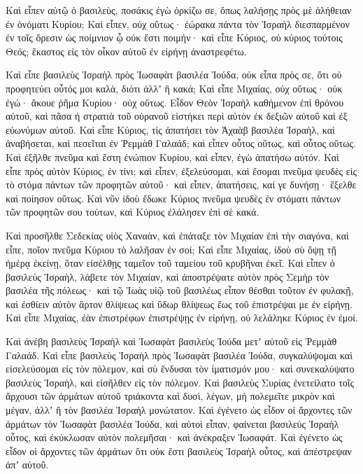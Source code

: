 {Καὶ εἶπεν αὐτῷ ὁ βασιλεὺς, ποσάκις ἐγὼ ὁρκίζω σε, ὅπως λαλήσῃς πρὸς μὲ ἀλήθειαν ἐν ὀνόματι Κυρίου;
Καὶ εἶπεν, οὐχ οὕτως· ἑώρακα πάντα τὸν Ἰσραὴλ διεσπαρμένον ἐν τοῖς ὄρεσιν ὡς ποίμνιον ᾧ οὐκ ἔστι ποιμήν· καὶ εἶπε Κύριος, οὐ κύριος τούτοις Θεός; ἕκαστος εἰς τὸν οἶκον αὐτοῦ ἐν εἰρήνῃ ἀναστρεφέτω.
\par }{\PP {}Καὶ εἶπε βασιλεὺς Ἰσραὴλ πρὸς Ἰωσαφὰτ βασιλέα Ἰούδα, οὐκ εἶπα πρὸς σε, ὅτι οὐ προφητεύει οὗτός μοι καλὰ, διότι ἀλλʼ ἢ κακά;
Καὶ εἶπε Μιχαίας, οὐχ οὕτως· οὐκ ἐγώ· ἄκουε ῥῆμα Κυρίου· οὐχ οὕτως. Εἶδον Θεὸν Ἰσραὴλ καθήμενον ἐπὶ θρόνου αὐτοῦ, καὶ πᾶσα ἡ στρατιὰ τοῦ οὐρανοῦ εἱστήκει περὶ αὐτὸν ἐκ δεξιῶν αὐτοῦ καὶ ἐξ εὐωνύμων αὐτοῦ.
Καὶ εἶπε Κύριος, τίς ἀπατήσει τὸν Ἀχαὰβ βασιλέα Ἰσραὴλ, καὶ ἀναβήσεται, καὶ πεσεῖται ἐν Ῥεμμὰθ Γαλαάδ; καὶ εἶπεν οὗτος οὕτως, καὶ οὗτος οὕτως.
Καὶ ἐξῆλθε πνεῦμα καὶ ἔστη ἐνώπιον Κυρίου, καὶ εἶπεν, ἐγὼ ἀπατήσω αὐτόν.
Καὶ εἶπε πρὸς αὐτὸν Κύριος, ἐν τίνι; καὶ εἶπεν, ἐξελεύσομαι, καὶ ἔσομαι πνεῦμα ψευδὲς εἰς τὸ στόμα πάντων τῶν προφητῶν αὐτοῦ· καὶ εἶπεν, ἀπατήσεις, καί γε δυνήσῃ· ἔξελθε καὶ ποίησον οὕτως.
Καὶ νῦν ἰδοὺ ἔδωκε Κύριος πνεῦμα ψευδὲς ἐν στόματι πάντων τῶν προφητῶν σου τούτων, καὶ Κύριος ἐλάλησεν ἐπὶ σὲ κακά.
\par }{\PP {}Καὶ προσῆλθε Σεδεκίας υἱὸς Χαναὰν, καὶ ἐπάταξε τὸν Μιχαίαν ἐπὶ τὴν σιαγόνα, καὶ εἶπε, ποῖον πνεῦμα Κύριου τὸ λαλῆσαν ἐν σοί;
Καὶ εἶπε Μιχαίας, ἰδοὺ σὺ ὄψῃ τῇ ἡμέρᾳ ἐκείνῃ, ὅταν εἰσέλθῃς ταμεῖον τοῦ ταμείου τοῦ κρυβῆναι ἐκεῖ.
Καὶ εἶπεν ὁ βασιλεὺς Ἰσραὴλ, λάβετε τὸν Μιχαίαν, καὶ ἀποστρέψατε αὐτὸν πρὸς Σεμὴρ τὸν βασιλέα τῆς πόλεως· καὶ τῷ Ἰωὰς υἱῷ τοῦ βασιλέως
εἶπον θέσθαι τοῦτον ἐν φυλακῇ, καὶ ἐσθίειν αὐτὸν ἄρτον θλίψεως καὶ ὕδωρ θλίψεως ἕως τοῦ ἐπιστρέψαι με ἐν εἰρήνῃ.
Καὶ εἶπε Μιχαίας, ἐὰν ἐπιστρέφων ἐπιστρέψῃς ἐν εἰρήνῃ, οὐ λελάληκε Κύριος ἐν ἐμοί.
\par }{\PP {}Καὶ ἀνέβη βασιλεὺς Ἰσραὴλ καὶ Ἰωσαφὰτ βασιλεὺς Ἰούδα μετʼ αὐτοῦ εἰς Ῥεμμὰθ Γαλαάδ.
Καὶ εἶπε βασιλεὺς Ἰσραὴλ πρὸς Ἰωσαφὰτ βασιλέα Ἰούδα, συγκαλύψομαι καὶ εἰσελεύσομαι εἰς τὸν πόλεμον, καὶ σὺ ἔνδυσαι τὸν ἱματισμόν μου· καὶ συνεκαλύψατο βασιλεὺς Ἰσραὴλ, καὶ εἰσῆλθεν εἰς τὸν πόλεμον.
Καὶ βασιλεὺς Συρίας ἐνετείλατο τοῖς ἄρχουσι τῶν ἁρμάτων αὐτοῦ τριάκοντα καὶ δυσὶ, λέγων, μὴ πολεμεῖτε μικρὸν καὶ μέγαν, ἀλλʼ ἢ τὸν βασιλέα Ἰσραὴλ μονώτατον.
Καὶ ἐγένετο ὡς εἶδον οἱ ἄρχοντες τῶν ἁρμάτων τὸν Ἰωσαφὰτ βασιλέα Ἰούδα, καὶ αὐτοὶ εἶπαν, φαίνεται βασιλεὺς Ἰσραήλ οὗτος, καὶ ἐκύκλωσαν αὐτὸν πολεμῆσαι· καὶ ἀνέκραξεν Ἰωσαφάτ.
Καὶ ἐγένετο ὡς εἶδον οἱ ἄρχοντες τῶν ἁρμάτων ὅτι οὐκ ἔστι βασιλεὺς Ἰσραὴλ οὗτος, καὶ ἀπέστρεψαν ἀπʼ αὐτοῦ.
}
